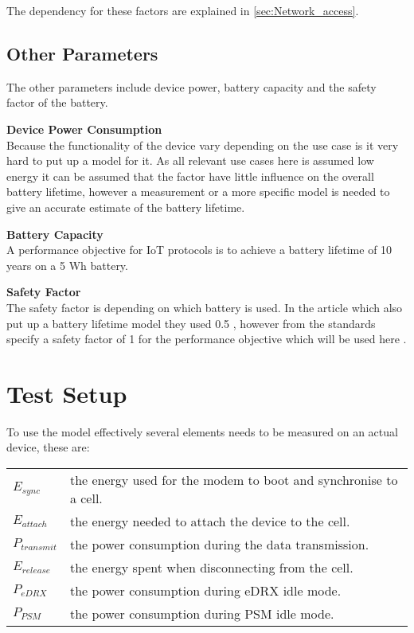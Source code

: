 The dependency for these factors are explained in \autoref{sec:Network_access}.



\subsection{Other Parameters}
The other parameters include device power, battery capacity and the safety factor of the battery.

\textbf{Device Power Consumption}\\
Because the functionality of the device vary depending on the use case is it very hard to put up a model for it. As all relevant use cases here is assumed low energy it can be assumed that the factor have little influence on the overall battery lifetime, however a measurement or a more specific model is needed to give an accurate estimate of the battery lifetime.

\textbf{Battery Capacity}\\
A performance objective for IoT protocols is to achieve a battery lifetime of 10 years on a 5 Wh battery. 

\textbf{Safety Factor}\\
The safety factor is depending on which battery is used. In the article which also put up a battery lifetime model they used 0.5 \citep{Power_article}, however from the standards specify a safety factor of 1 for the performance objective which will be used here \citep[Sec. 5.4]{safty_factor_standard}.


\section{Test Setup}
To use the model effectively several elements needs to be measured on an actual device, these are:

\begin{tabular}{ll}
$E_{sync}$ & the energy used for the modem to boot and synchronise to a cell. \\
$E_{attach}$ & the energy needed to attach the device to the cell. \\
$P_{transmit}$ & the power consumption during the data transmission. \\
$E_{release}$ & the energy spent when disconnecting from the cell. \\
$P_{eDRX}$ & the power consumption during \gls{eDRX} idle mode. \\
$P_{PSM}$ & the power consumption during \gls{PSM} idle mode. \\
\end{tabular}


